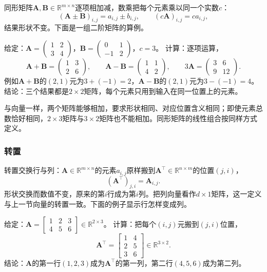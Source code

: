同形矩阵$\bm A,\bm B\in\mathbb R^{m\times n}$逐项相加减，数乘把每个元素乘以同一个实数$c$：
\[
 (\bm A\pm\bm B)_{i,j}=a_{i,j}\pm b_{i,j},\qquad
 (c\bm A)_{i,j}=ca_{i,j},
\]
结果形状不变。下面是一组二阶矩阵的算例。
\begin{example}
\label{ex:ls-matrix-addition-scaling}
给定：$\bm A=\left(\begin{smallmatrix}1&2\\3&4\end{smallmatrix}\right)$，$\bm B=\left(\begin{smallmatrix}0&1\\-1&2\end{smallmatrix}\right)$，$c=3$。
计算：逐项运算，
\[
 \bm A+\bm B=\begin{pmatrix}1&3\\2&6\end{pmatrix},\qquad
 \bm A-\bm B=\begin{pmatrix}1&1\\4&2\end{pmatrix},\qquad
 3\bm A=\begin{pmatrix}3&6\\9&12\end{pmatrix}.
\]
例如$\bm A+\bm B$的$(2,1)$元为$3+(-1)=2$，$\bm A-\bm B$的$(2,1)$元为$3-(-1)=4$。
结论：三个结果都是$2\times2$矩阵，每个元素只用到输入在同一位置上的元素。
\end{example}
与向量一样，两个矩阵能够相加，要求形状相同、对应位置含义相同；即使元素总数恰好相同，$2\times3$矩阵与$3\times2$矩阵也不能相加。同形矩阵的线性组合按同样方式定义。

\subsubsection{转置}

转置交换行与列：$\bm A\in\mathbb R^{m\times n}$的元素$a_{i,j}$原样搬到$\bm A^\top\in\mathbb R^{n\times m}$的位置$(j,i)$，
\[
 (\bm A^\top)_{j,i}=\bm A_{i,j}.
\]
形状交换而数值不变，原来的第$i$行成为第$i$列。把列向量看作$d\times1$矩阵，这一定义与上一节向量的转置一致。下面的例子显示行怎样变成列。
\begin{example}
\label{ex:ls-transpose-two-by-three}
给定：$\bm A=\left[\begin{smallmatrix}1&2&3\\4&5&6\end{smallmatrix}\right]\in\mathbb R^{2\times3}$。
计算：把每个$(i,j)$元搬到$(j,i)$位置，
\[
 \bm A^\top=\begin{bmatrix}1&4\\2&5\\3&6\end{bmatrix}\in\mathbb R^{3\times2}.
\]
结论：$\bm A$的第一行$(1,2,3)$成为$\bm A^\top$的第一列，第二行$(4,5,6)$成为第二列。
\end{example}

